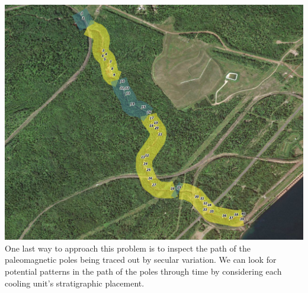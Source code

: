 \documentclass{article}
\begin{document}
\includegraphics[width=\textwidth]{../data/SLB/plots/SLB_shadedbyVGPlat.png}\\

One last way to approach this problem is to inspect the path of the
paleomagnetic poles being traced out by secular variation. We can look
for potential patterns in the path of the poles through time by
considering each cooling unit's stratigraphic placement.
\end{document}
